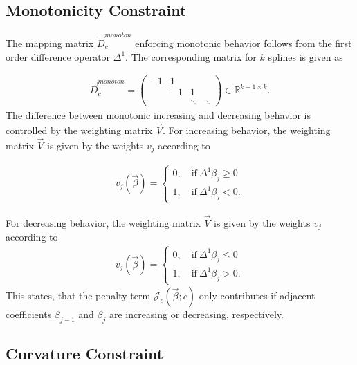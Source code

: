 \documentclass[10pt,a4paper]{report}
\begin{document}
\subsection{Monotonicity Constraint}

The mapping matrix $\vec{D}_c^{monoton}$ enforcing monotonic behavior follows from the first order difference operator $\Delta^1$. The corresponding matrix for $k$ splines is given as

\begin{align} \label{eq:D_c_monoton}
	\vec{D}_c^{monoton} = \begin{pmatrix}  -1 & 1  &  		& \\ 
		& -1 & 1 		& \\ 
		&    & \ddots  & \ddots  
	\end{pmatrix} \in \mathbb{R}^{k-1 \times k}.
\end{align}
The difference between monotonic increasing and decreasing behavior is controlled by the weighting matrix $\vec{V}$. For increasing behavior, the weighting matrix $\vec{V}$ is given by the weights $v_j$ according to

\begin{align} \label{eq:v_monoton_inc}
	v_j(\vec{\beta}) = \begin{cases} 0, \quad \text{if} \ \Delta^1\beta_j \ge 0 \\ 
		1, \quad \text{if} \ \Delta^1\beta_j < 0.
	\end{cases}	
\end{align}

For decreasing behavior, the weighting matrix $\vec{V}$ is given by the weights $v_j$ according to
\begin{align} \label{eq:v_monoton_dec}
	v_j(\vec{\beta}) = \begin{cases} 0, \quad \text{if} \ \Delta^1\beta_j \le 0 \\ 
		1, \quad \text{if} \ \Delta^1\beta_j > 0.
	\end{cases}	
\end{align}
This states, that the penalty term $\mathcal{J}_c(\vec{\beta}; c)$ only contributes if adjacent coefficients $\beta_{j-1}$ and $\beta_j$ are increasing or decreasing, respectively. \cite{hofner2011monotonicity} \cite{eilers2005unimodal}

\subsection{Curvature Constraint}
\end{document}
